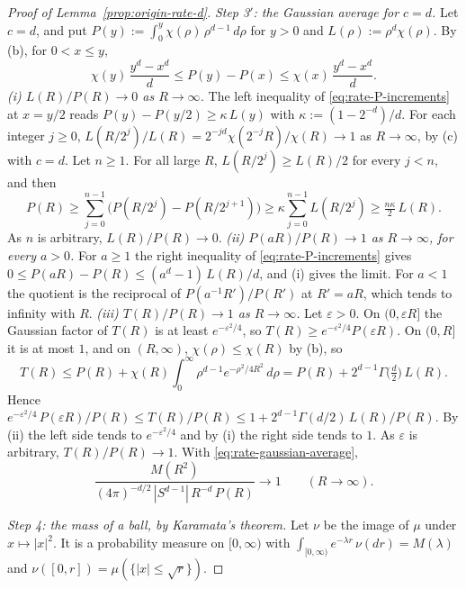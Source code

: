 \begin{proof}[Proof of Lemma~\ref{prop:origin-rate-d}]
\emph{Step 3$'$: the Gaussian average for $c = d$.} Let $c = d$, and put
$P(y) := \int_0^y\chi(\rho)\,\rho^{d-1}\,d\rho$ for $y > 0$ and $L(\rho) := \rho^{d}\chi(\rho)$.
By (b), for $0 < x \le y$,
\begin{equation}\label{eq:rate-P-increments}
  \chi(y)\,\frac{y^{d} - x^{d}}{d} \le P(y) - P(x) \le \chi(x)\,\frac{y^{d} - x^{d}}{d} .
\end{equation}
\emph{(i) $L(R)/P(R) \to 0$ as $R \to \infty$.} The left inequality of
\ref{eq:rate-P-increments} at $x = y/2$ reads $P(y) - P(y/2) \ge \kappa\,L(y)$ with
$\kappa := (1 - 2^{-d})/d$. For each integer $j \ge 0$,
$L(R/2^j)/L(R) = 2^{-jd}\chi(2^{-j}R)/\chi(R) \to 1$ as $R \to \infty$, by (c) with $c = d$. Let
$n \ge 1$. For all large $R$, $L(R/2^j) \ge L(R)/2$ for every $j < n$, and then
\[
  P(R) \ge \sum_{j=0}^{n-1}\bigl(P(R/2^j) - P(R/2^{j+1})\bigr) \ge \kappa\sum_{j=0}^{n-1}L(R/2^j)
   \ge \tfrac{n\kappa}{2}\,L(R) .
\]
As $n$ is arbitrary, $L(R)/P(R) \to 0$.
\emph{(ii) $P(aR)/P(R) \to 1$ as $R \to \infty$, for every $a > 0$.} For $a \ge 1$ the right
inequality of \ref{eq:rate-P-increments} gives
$0 \le P(aR) - P(R) \le (a^{d} - 1)\,L(R)/d$, and (i) gives the limit. For $a < 1$ the quotient is
the reciprocal of $P(a^{-1}R')/P(R')$ at $R' = aR$, which tends to infinity with $R$.
\emph{(iii) $T(R)/P(R) \to 1$ as $R \to \infty$.} Let $\varepsilon > 0$. On $(0, \varepsilon R]$
the Gaussian factor of $T(R)$ is at least $e^{-\varepsilon^2/4}$, so
$T(R) \ge e^{-\varepsilon^2/4}P(\varepsilon R)$. On $(0, R]$ it is at most $1$, and on $(R,\infty)$,
$\chi(\rho) \le \chi(R)$ by (b), so
\[
  T(R) \le P(R) + \chi(R)\int_0^\infty\rho^{d-1}e^{-\rho^2/4R^2}\,d\rho
   = P(R) + 2^{d-1}\Gamma\bigl(\tfrac d2\bigr)\,L(R) .
\]
Hence
$e^{-\varepsilon^2/4}\,P(\varepsilon R)/P(R) \le T(R)/P(R) \le 1 + 2^{d-1}\Gamma(d/2)\,L(R)/P(R)$.
By (ii) the left side tends to $e^{-\varepsilon^2/4}$ and by (i) the right side tends to $1$. As
$\varepsilon$ is arbitrary, $T(R)/P(R) \to 1$. With \ref{eq:rate-gaussian-average},
\begin{equation}\label{eq:rate-abelian-critical}
  \frac{M(R^2)}{(4\pi)^{-d/2}\,|S^{d-1}|\,R^{-d}\,P(R)} \to 1 \qquad (R \to \infty) .
\end{equation}

\emph{Step 4: the mass of a ball, by Karamata's theorem.} Let $\nu$ be the image of $\mu$ under
$x \mapsto |x|^2$. It is a probability measure on $[0,\infty)$ with
$\int_{[0,\infty)}e^{-\lambda r}\,\nu(dr) = M(\lambda)$ and $\nu([0,r]) = \mu(\{|x| \le \sqrt r\})$.


\end{proof}
